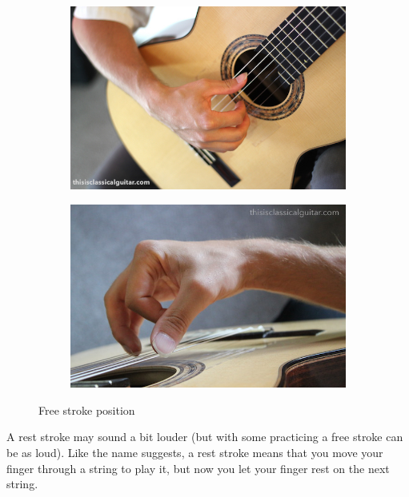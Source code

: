\begin{figure}[h]
  \begin{subfigure}[b]{0.45\textwidth}
    \includegraphics[width=\textwidth]{../Images/Bradford-right-hand-close-2016.jpg}
    \caption{}
    \label{fig:}
  \end{subfigure}
  \hfill
  \begin{subfigure}[b]{0.45\textwidth}
    \includegraphics[width=\textwidth]{../Images/brad-right-stroke-2016.jpg}
    \caption{}
    \label{fig:}
  \end{subfigure}
  \caption{Free stroke position \cite{FreeStrokePositionBradlyWerner}}
  \label{fig:free_stoke_hand_position}
\end{figure}

A rest stroke may sound a bit louder (but with some practicing a free stroke can be as loud). Like the name suggests, a rest stroke means that you move your finger through a string to play it, but now you let your finger rest on the next string.

